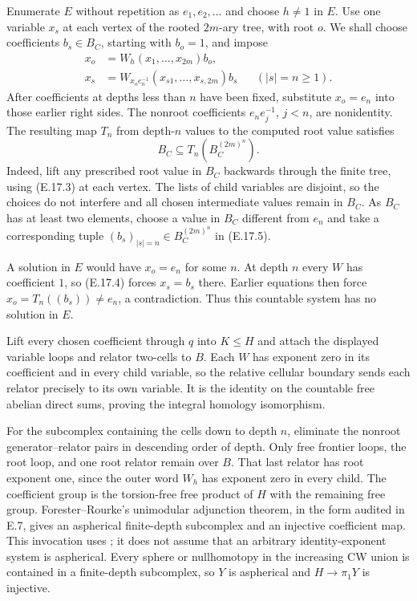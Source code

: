 Enumerate $E$ without repetition as $e_1,e_2,\ldots$ and
choose $h\ne1$ in $E$. Use one variable $x_s$ at each vertex
of the rooted $2m$-ary tree, with root $o$. We shall choose
coefficients $b_s\in B_C$, starting with $b_o=1$, and impose
\[
 \begin{aligned}
 x_o&=W_h(x_1,\ldots,x_{2m})b_o,\\
 x_s&=W_{x_oe_n^{-1}}(x_{s1},\ldots,x_{s,2m})b_s
            &&(|s|=n\geq1).
 \end{aligned}
 \tag{E.17.4}
\]
After coefficients at depths less than $n$ have been fixed,
substitute $x_o=e_n$ into those earlier right sides. The
nonroot coefficients $e_ne_j^{-1}$, $j<n$, are nonidentity.
The resulting map $T_n$ from depth-$n$ values to the computed
root value satisfies
\[
                  B_C\subseteq T_n(B_C^{(2m)^n}).
 \tag{E.17.5}
\]
Indeed, lift any prescribed root value in $B_C$ backwards
through the finite tree, using (E.17.3) at each vertex. The
lists of child variables are disjoint, so the choices do not
interfere and all chosen intermediate values remain in $B_C$.
As $B_C$ has at least two elements, choose a value in $B_C$
different from $e_n$ and take a corresponding tuple
$(b_s)_{|s|=n}\in B_C^{(2m)^n}$ in (E.17.5).

A solution in $E$ would have $x_o=e_n$ for some $n$.
At depth $n$ every $W$ has coefficient $1$, so (E.17.4)
forces $x_s=b_s$ there. Earlier equations then force
$x_o=T_n((b_s))\ne e_n$, a contradiction. Thus this countable
system has no solution in $E$.

Lift every chosen coefficient through $q$ into $K\leq H$
and attach the displayed variable loops and relator two-cells
to $B$. Each $W$ has exponent zero in its coefficient and
in every child variable, so the relative cellular boundary
sends each relator precisely to its own variable. It is the
identity on the countable free abelian direct sums, proving
the integral homology isomorphism.

For the subcomplex containing the cells down to depth $n$,
eliminate the nonroot generator--relator pairs in descending
order of depth. Only free frontier loops, the root loop,
and one root relator remain over $B$. That last relator has
root exponent one, since the outer word $W_h$ has exponent
zero in every child. The coefficient group is the torsion-free
free product of $H$ with the remaining free group.
Forester--Rourke's unimodular adjunction theorem, in the
form audited in E.7, gives an aspherical finite-depth
subcomplex and an injective coefficient map. This invocation
uses \cite[Main Theorem]{EForesterRourkeDiagrams}; it does not
assume that an arbitrary identity-exponent system is aspherical.
Every sphere or nullhomotopy in the increasing CW union is
contained in a finite-depth subcomplex, so $Y$ is aspherical
and $H\to\pi_1Y$ is injective.

